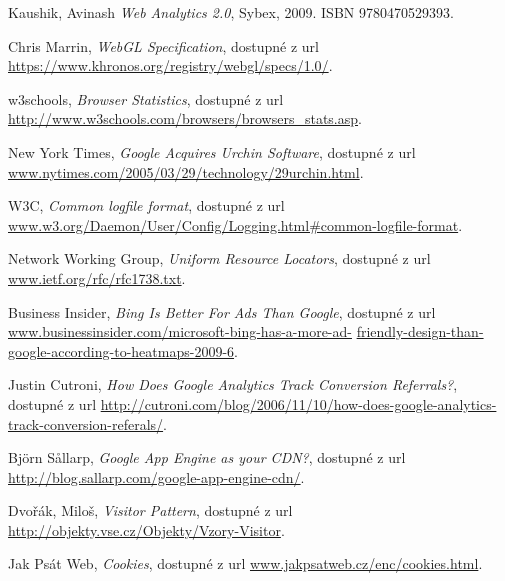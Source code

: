\documentclass[bc,male,java,dept456]{diploma}						%
\begin{document}
\begin{thebibliography}{99}


 Kaushik, Avinash
\textit{Web Analytics 2.0}, Sybex, 2009. ISBN 9780470529393.


 Chris Marrin,
\textit{WebGL Specification}, dostupné z url \url{https://www.khronos.org/registry/webgl/specs/1.0/}.

 w3schools,
\textit{Browser Statistics}, dostupné z url \url{http://www.w3schools.com/browsers/browsers_stats.asp}.


 New York Times,
\textit{Google Acquires Urchin Software}, dostupné z url \url{www.nytimes.com/2005/03/29/technology/29urchin.html}.

 W3C,
\textit{Common logfile format}, dostupné z url \url{www.w3.org/Daemon/User/Config/Logging.html#common-logfile-format}.


 Network Working Group,
\textit{Uniform Resource Locators}, dostupné z url \url{www.ietf.org/rfc/rfc1738.txt}.

 Business Insider,
\textit{Bing Is Better For Ads Than Google}, dostupné z url \url{www.businessinsider.com/microsoft-bing-has-a-more-ad-} \url{friendly-design-than-google-according-to-heatmaps-2009-6}.


 Justin Cutroni,
\textit{How Does Google Analytics Track Conversion Referrals?}, dostupné z url \url{http://cutroni.com/blog/2006/11/10/how-does-google-analytics-track-conversion-referals/}.





 Björn Sållarp,
\textit{Google App Engine as your CDN?}, dostupné z url \url{http://blog.sallarp.com/google-app-engine-cdn/}.


 Dvořák, Miloš,
\textit{Visitor Pattern}, dostupné z url \url{http://objekty.vse.cz/Objekty/Vzory-Visitor}.


 Jak Psát Web,
\textit{Cookies}, dostupné z url \url{www.jakpsatweb.cz/enc/cookies.html}.


\end{thebibliography}
\end{document}
